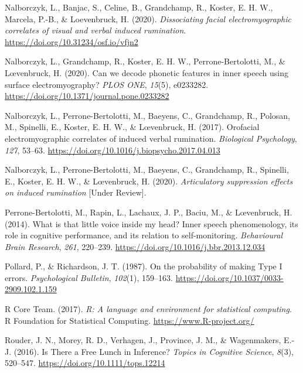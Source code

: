 \documentclass[
  english,
  man,floatsintext]{apa6}
\newlength{\cslhangindent}
\newenvironment{cslreferences}%
  {\setlength{\parindent}{0pt}%
  \everypar{\setlength{\hangindent}{\cslhangindent}}\ignorespaces}%
  {\par}
\begin{document}
\begin{cslreferences}
\leavevmode\hypertarget{ref-nalborczyk_dissociating_2020}{}%
Nalborczyk, L., Banjac, S., Celine, B., Grandchamp, R., Koster, E. H. W., Marcela, P.-B., \& Loevenbruck, H. (2020). \emph{Dissociating facial electromyographic correlates of visual and verbal induced rumination}. \url{https://doi.org/10.31234/osf.io/vfjn2}

\leavevmode\hypertarget{ref-nalborczyk_can_2020}{}%
Nalborczyk, L., Grandchamp, R., Koster, E. H. W., Perrone-Bertolotti, M., \& Lœvenbruck, H. (2020). Can we decode phonetic features in inner speech using surface electromyography? \emph{PLOS ONE}, \emph{15}(5), e0233282. \url{https://doi.org/10.1371/journal.pone.0233282}

\leavevmode\hypertarget{ref-nalborczyk_orofacial_2017}{}%
Nalborczyk, L., Perrone-Bertolotti, M., Baeyens, C., Grandchamp, R., Polosan, M., Spinelli, E., Koster, E. H. W., \& Lœvenbruck, H. (2017). Orofacial electromyographic correlates of induced verbal rumination. \emph{Biological Psychology}, \emph{127}, 53--63. \url{https://doi.org/10.1016/j.biopsycho.2017.04.013}

\leavevmode\hypertarget{ref-nalborczyk_articulatory_2020}{}%
Nalborczyk, L., Perrone-Bertolotti, M., Baeyens, C., Grandchamp, R., Spinelli, E., Koster, E. H. W., \& Lœvenbruck, H. (2020). \emph{Articulatory suppression effects on induced rumination} {[}Under Review{]}.

\leavevmode\hypertarget{ref-perrone-bertolotti_what_2014}{}%
Perrone-Bertolotti, M., Rapin, L., Lachaux, J. P., Baciu, M., \& Lœvenbruck, H. (2014). What is that little voice inside my head? Inner speech phenomenology, its role in cognitive performance, and its relation to self-monitoring. \emph{Behavioural Brain Research}, \emph{261}, 220--239. \url{https://doi.org/10.1016/j.bbr.2013.12.034}

\leavevmode\hypertarget{ref-pollard_probability_1987}{}%
Pollard, P., \& Richardson, J. T. (1987). On the probability of making Type I errors. \emph{Psychological Bulletin}, \emph{102}(1), 159--163. \url{https://doi.org/10.1037/0033-2909.102.1.159}

\leavevmode\hypertarget{ref-R-base}{}%
R Core Team. (2017). \emph{R: A language and environment for statistical computing}. R Foundation for Statistical Computing. \url{https://www.R-project.org/}

\leavevmode\hypertarget{ref-rouder_is_2016}{}%
Rouder, J. N., Morey, R. D., Verhagen, J., Province, J. M., \& Wagenmakers, E.-J. (2016). Is There a Free Lunch in Inference? \emph{Topics in Cognitive Science}, \emph{8}(3), 520--547. \url{https://doi.org/10.1111/tops.12214}


\end{cslreferences}
\end{document}
